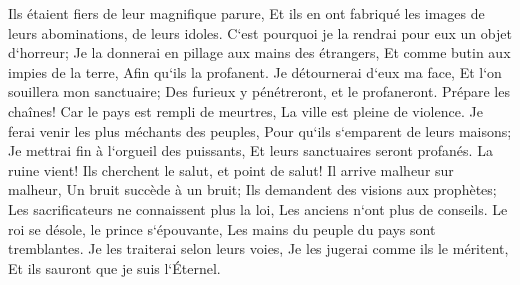 \verse Ils étaient fiers de leur magnifique parure, Et ils en ont fabriqué les images de leurs abominations, de leurs idoles. C`est pourquoi je la rendrai pour eux un objet d`horreur; 
\verse Je la donnerai en pillage aux mains des étrangers, Et comme butin aux impies de la terre, Afin qu`ils la profanent. 
\verse Je détournerai d`eux ma face, Et l`on souillera mon sanctuaire; Des furieux y pénétreront, et le profaneront. 
\verse Prépare les chaînes! Car le pays est rempli de meurtres, La ville est pleine de violence. 
\verse Je ferai venir les plus méchants des peuples, Pour qu`ils s`emparent de leurs maisons; Je mettrai fin à l`orgueil des puissants, Et leurs sanctuaires seront profanés. 
\verse La ruine vient! Ils cherchent le salut, et point de salut! 
\verse Il arrive malheur sur malheur, Un bruit succède à un bruit; Ils demandent des visions aux prophètes; Les sacrificateurs ne connaissent plus la loi, Les anciens n`ont plus de conseils. 
\verse Le roi se désole, le prince s`épouvante, Les mains du peuple du pays sont tremblantes. Je les traiterai selon leurs voies, Je les jugerai comme ils le méritent, Et ils sauront que je suis l`Éternel. 

\chapter{}

